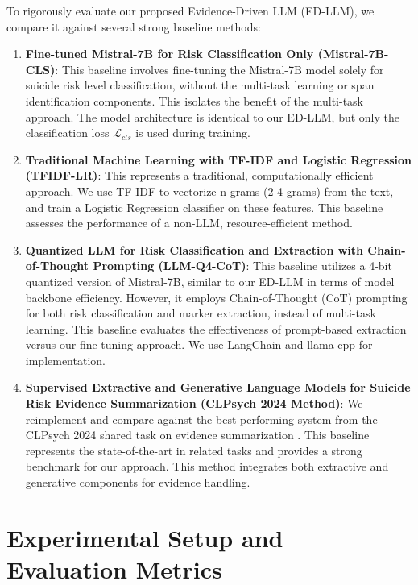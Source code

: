 To rigorously evaluate our proposed Evidence-Driven LLM (ED-LLM), we compare it against several strong baseline methods:

\begin{enumerate}
    \item \textbf{Fine-tuned Mistral-7B for Risk Classification Only (Mistral-7B-CLS)}: This baseline involves fine-tuning the Mistral-7B model solely for suicide risk level classification, without the multi-task learning or span identification components. This isolates the benefit of the multi-task approach. The model architecture is identical to our ED-LLM, but only the classification loss $\mathcal{L}_{cls}$ is used during training.

    \item \textbf{Traditional Machine Learning with TF-IDF and Logistic Regression (TFIDF-LR)}: This represents a traditional, computationally efficient approach. We use TF-IDF to vectorize n-grams (2-4 grams) from the text, and train a Logistic Regression classifier on these features. This baseline assesses the performance of a non-LLM, resource-efficient method.

    \item \textbf{Quantized LLM for Risk Classification and Extraction with Chain-of-Thought Prompting (LLM-Q4-CoT)}:  This baseline utilizes a 4-bit quantized version of Mistral-7B, similar to our ED-LLM in terms of model backbone efficiency. However, it employs Chain-of-Thought (CoT) prompting for both risk classification and marker extraction, instead of multi-task learning. This baseline evaluates the effectiveness of prompt-based extraction versus our fine-tuning approach. We use LangChain and llama-cpp for implementation.

    \item  \textbf{Supervised Extractive and Generative Language Models for Suicide Risk Evidence Summarization (CLPsych 2024 Method)}: We reimplement and compare against the best performing system from the CLPsych 2024 shared task on evidence summarization \cite{CLPsych2024}. This baseline represents the state-of-the-art in related tasks and provides a strong benchmark for our approach.  This method integrates both extractive and generative components for evidence handling.
\end{enumerate}





\section{Experimental Setup and Evaluation Metrics}


